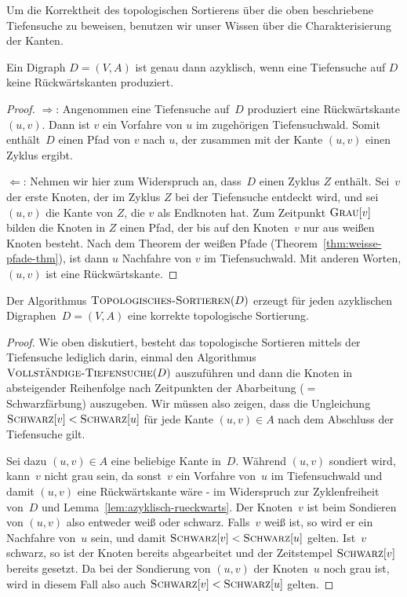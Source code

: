 \begin{bem} 
Um die Korrektheit des topologischen Sortierens über die oben beschriebene Tiefensuche zu beweisen, benutzen wir unser Wissen über die Charakterisierung der Kanten.
\end{bem} 

\begin{lem}
\label{lem:azyklisch-rueckwarts}
Ein Digraph $D=(V,A)$ ist genau dann azyklisch, wenn eine Tiefensuche auf $D$ keine Rückwärtskanten produziert.
\end{lem}

\begin{proof}
\glqq $\Longrightarrow$\grqq: Angenommen eine Tiefensuche auf~$D$ produziert eine Rückwärtskante $(u,v)$.
Dann ist $v$ ein Vorfahre von $u$ im zugehörigen Tiefensuchwald.
Somit enthält~$D$ einen Pfad von $v$ nach $u$, der zusammen mit der Kante $(u,v)$ einen Zyklus ergibt.

\glqq $\Longleftarrow$\grqq: Nehmen wir hier zum Widerspruch an, dass~$D$ einen Zyklus $Z$ enthält.
Sei~$v$ der erste Knoten, der im Zyklus $Z$ bei der Tiefensuche entdeckt wird, und sei $(u,v)$ die Kante von $Z$, die $v$ als Endknoten hat.
Zum Zeitpunkt $\mathop{\text{\textsc{Grau}}}[v]$ bilden die Knoten in $Z$ einen Pfad, der bis auf den Knoten~$v$ nur aus weißen Knoten besteht.
Nach dem Theorem der weißen Pfade (Theorem~\ref{thm:weisse-pfade-thm}), ist dann $u$ Nachfahre von $v$ im Tiefensuchwald.
Mit anderen Worten, $(u,v)$ ist eine Rückwärtskante.
\end{proof}

\begin{thm}
Der Algorithmus $\mathop{\text{\textsc{Topologisches-Sortieren}}}(D)$ erzeugt für jeden azyklischen Digraphen~$D=(V,A)$ eine korrekte topologische Sortierung.
\end{thm}

\begin{proof}
Wie oben diskutiert, besteht das topologische Sortieren mittels der Tiefensuche lediglich darin, einmal den Algorithmus $\mathop{\text{\textsc{Vollständige-Tiefensuche}}}(D)$ auszuführen und dann die Knoten in absteigender Reihenfolge nach Zeitpunkten der Abarbeitung ($=$ Schwarzfärbung) auszugeben.
Wir müssen also zeigen, dass die Ungleichung $\mathop{\text{\textsc{Schwarz}}}[v] < \mathop{\text{\textsc{Schwarz}}}[u]$ für jede Kante $(u,v) \in A$ nach dem Abschluss der Tiefensuche gilt.

Sei dazu $(u,v) \in A$ eine beliebige Kante in~$D$.
Während $(u,v)$ sondiert wird, kann~$v$ nicht grau sein, da sonst~$v$ ein Vorfahre von~$u$ im Tiefensuchwald und damit $(u,v)$ eine Rückwärtskante wäre - im Widerspruch zur Zyklenfreiheit von~$D$ und Lemma~\ref{lem:azyklisch-rueckwarts}.
Der Knoten~$v$ ist beim Sondieren von $(u,v)$ also entweder weiß oder schwarz.
Falls~$v$ weiß ist, so wird er ein Nachfahre von~$u$ sein, und damit $\mathop{\text{\textsc{Schwarz}}}[v] < \mathop{\text{\textsc{Schwarz}}}[u]$ gelten.
Ist~$v$ schwarz, so ist der Knoten bereits abgearbeitet und der Zeitstempel $\mathop{\text{\textsc{Schwarz}}}[v]$ bereits gesetzt.
Da bei der Sondierung von $(u,v)$ der Knoten~$u$ noch grau ist, wird in diesem Fall also auch $\mathop{\text{\textsc{Schwarz}}}[v] < \mathop{\text{\textsc{Schwarz}}}[u]$ gelten.
\end{proof}


